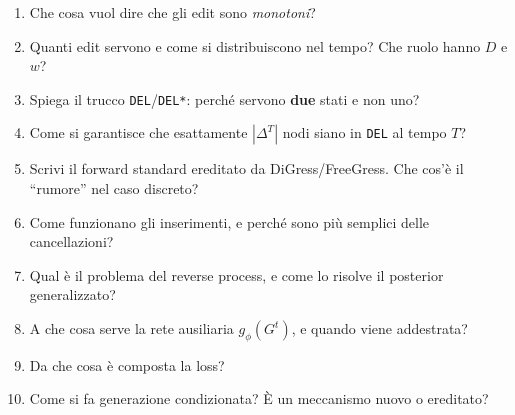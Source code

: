\begin{tcolorbox}[mywarn, title={Livello 2 — sai come funziona}]
\begin{enumerate}
  \item Che cosa vuol dire che gli edit sono \emph{monotoni}?
  \item Quanti edit servono e come si distribuiscono nel tempo? Che ruolo hanno $D$ e $w$?
  \item Spiega il trucco \texttt{DEL}/\texttt{DEL*}: perché servono \textbf{due} stati e non uno?
  \item Come si garantisce che esattamente $|\Delta^T|$ nodi siano in \texttt{DEL} al tempo $T$?
  \item Scrivi il forward standard ereditato da DiGress/FreeGress. Che cos'è il ``rumore'' nel caso discreto?
  \item Come funzionano gli inserimenti, e perché sono più semplici delle cancellazioni?
  \item Qual è il problema del reverse process, e come lo risolve il posterior generalizzato?
  \item A che cosa serve la rete ausiliaria $g_\phi(G^t)$, e quando viene addestrata?
  \item Da che cosa è composta la loss?
  \item Come si fa generazione condizionata? È un meccanismo nuovo o ereditato?
\end{enumerate}
\end{tcolorbox}

